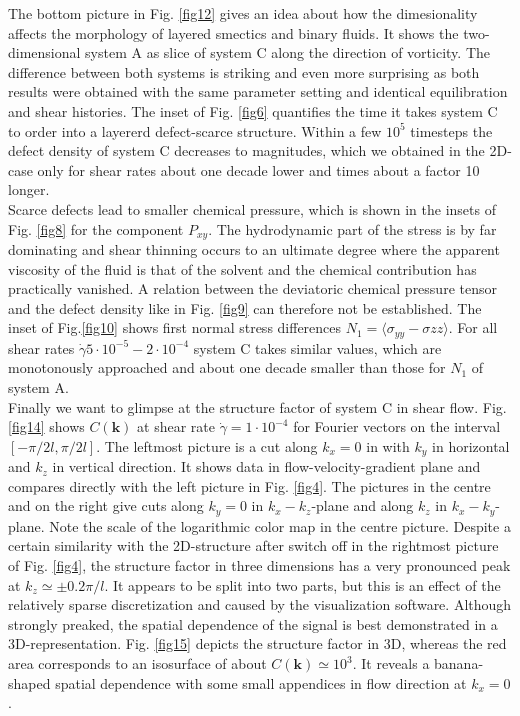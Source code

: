\documentclass[8.5pt,twoside,twocolumn]{article}
\newcommand{\e}[1]{\cdot10^{#1}}
\newcommand{\gd}{\dot{\gamma}}
\begin{document}
The bottom picture in Fig. \ref{fig12} gives an idea about how the dimesionality affects the morphology of layered smectics and binary fluids.
It shows the two-dimensional system A as slice of system C along the direction of vorticity.
The difference between both systems is striking and even more surprising as both results were obtained with the same parameter setting and identical equilibration and shear histories.
The inset of Fig. \ref{fig6} quantifies the time it takes system C to order into a layererd defect-scarce structure.
Within a few $10^5$ timesteps the defect density of system C decreases to magnitudes, which we obtained in the 2D-case only for shear rates about one decade lower and times about a factor 10 longer.\\
Scarce defects lead to smaller chemical pressure, which is shown in the insets of Fig. \ref{fig8} for the component $P_{xy}$.
The hydrodynamic part of the stress is by far dominating and shear thinning occurs to an ultimate degree where the apparent viscosity of the fluid is that of the solvent and the chemical contribution has practically vanished.
A relation between the deviatoric chemical pressure tensor and the defect density like in Fig. \ref{fig9} can therefore not be established.
The inset of Fig.\ref{fig10} shows first normal stress differences $N_1=\langle\sigma_{yy}-\sigma{zz}\rangle$.
For all shear rates $\gd5\e{-5}-2\e{-4}$ system C takes similar values, which are monotonously approached and about one decade smaller than those for $N_1$ of system A.\\ 
Finally we want to glimpse at the structure factor of system C in shear flow.
Fig. \ref{fig14} shows $C({\bm k})$ at shear rate $\gd=1\e{-4}$ for Fourier vectors on the interval $[-\pi/2 l, \pi/ 2 l]$.
The leftmost picture is a cut along $k_x=0$ in with $k_y$ in horizontal and $k_z$ in vertical direction.
It shows data in flow-velocity-gradient plane and compares directly with the left picture in Fig. \ref{fig4}.
The pictures in the centre and on the right give cuts along $k_y=0$ in $k_x-k_z$-plane and along $k_z$ in $k_x-k_y$-plane. 
Note the scale of the logarithmic color map in the centre picture.
Despite a certain similarity with the 2D-structure after switch off in the rightmost picture of Fig. \ref{fig4}, the structure factor in three dimensions has a very pronounced peak at $k_z\simeq\pm0.2\pi/l$.
It appears to be split into two parts, but this is an effect of the relatively sparse discretization and caused by the visualization software.
Although strongly preaked, the spatial dependence of the signal is best demonstrated in a 3D-representation. 
Fig. \ref{fig15} depicts the structure factor in 3D, whereas the red area corresponds to an isosurface of about $C({\bm k})\simeq 10^3$.
It reveals a banana-shaped spatial dependence with some small appendices in flow direction at $k_x=0$.
\end{document}
